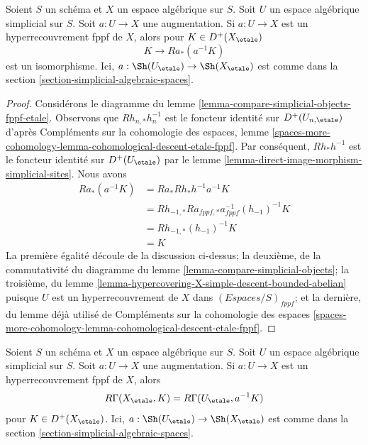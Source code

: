 \begin{lemma}
\label{lemma-cohomological-descent-for-fppf-hypercovering}
Soient $S$ un schéma et $X$ un espace algébrique sur $S$.
Soit $U$ un espace algébrique simplicial sur $S$. Soit $a : U \to X$
une augmentation. Si $a : U \to X$ est un hyperrecouvrement fppf de $X$,
alors pour $K \in D^+(X_\etale)$
$$
K \to Ra_*(a^{-1}K)
$$
est un isomorphisme. Ici, $a : \Sh(U_\etale) \to \Sh(X_\etale)$
est comme dans la section \ref{section-simplicial-algebraic-spaces}.
\end{lemma}

\begin{proof}
Considérons le diagramme du lemme \ref{lemma-compare-simplicial-objects-fppf-etale}.
Observons que $Rh_{n, *}h_n^{-1}$ est le foncteur identité
sur $D^+(U_{n, \etale})$ d'après
Compléments sur la cohomologie des espaces, lemme
\ref{spaces-more-cohomology-lemma-cohomological-descent-etale-fppf}.
Par conséquent, $Rh_*h^{-1}$ est le foncteur identité sur
$D^+(U_\etale)$ par
le lemme \ref{lemma-direct-image-morphism-simplicial-sites}.
Nous avons
\begin{align*}
Ra_*(a^{-1}K)
& =
Ra_*Rh_*h^{-1}a^{-1}K \\
& =
Rh_{-1, *}Ra_{fppf, *}a_{fppf}^{-1}(h_{-1})^{-1}K \\
& =
Rh_{-1, *}(h_{-1})^{-1}K \\
& =
K
\end{align*}
La première égalité découle de la discussion ci-dessus; la deuxième,
de la commutativité du diagramme du lemme
\ref{lemma-compare-simplicial-objects}; la troisième, du lemme
\ref{lemma-hypercovering-X-simple-descent-bounded-abelian}
puisque $U$ est un hyperrecouvrement de $X$ dans $(\textit{Espaces}/S)_{fppf}$;
et la dernière, du lemme déjà utilisé de
Compléments sur la cohomologie des espaces
\ref{spaces-more-cohomology-lemma-cohomological-descent-etale-fppf}.
\end{proof}

\begin{lemma}
\label{lemma-compute-via-fppf-hypercovering}
Soient $S$ un schéma et $X$ un espace algébrique sur $S$.
Soit $U$ un espace algébrique simplicial sur $S$. Soit $a : U \to X$
une augmentation. Si $a : U \to X$ est un hyperrecouvrement fppf de $X$, alors
$$
R\Gamma(X_\etale, K) = R\Gamma(U_\etale, a^{-1}K)
$$
pour $K \in D^+(X_\etale)$. Ici, $a : \Sh(U_\etale) \to \Sh(X_\etale)$
est comme dans la section \ref{section-simplicial-algebraic-spaces}.
\end{lemma}

